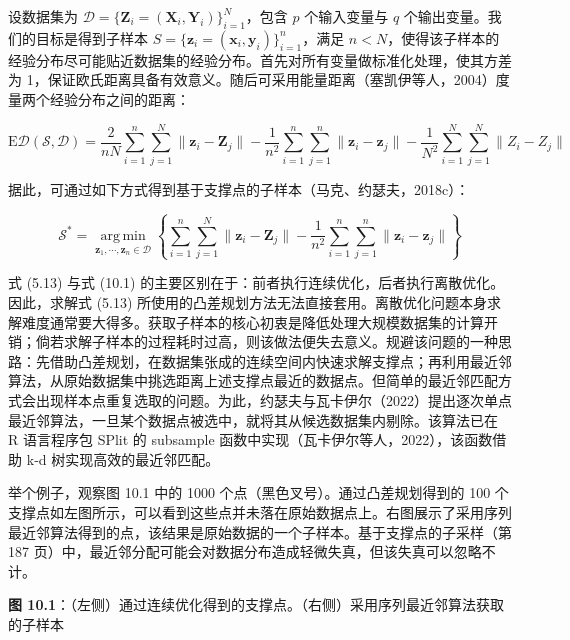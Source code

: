 \documentclass{ctexart}
\DeclareMathOperator*{\argmin}{arg\,min}
\begin{document}
设数据集为 $\mathcal{D}=\{\boldsymbol{Z}_i=(\boldsymbol{X}_i,\boldsymbol{Y}_i)\}_{i=1}^{N}$，包含 $p$ 个输入变量与 $q$ 个输出变量。我们的目标是得到子样本 $S=\{\boldsymbol{z}_i=(\boldsymbol{x}_i,\boldsymbol{y}_i)\}_{i=1}^{n}$，满足 $n<N$，使得该子样本的经验分布尽可能贴近数据集的经验分布。首先对所有变量做标准化处理，使其方差为 1，保证欧氏距离具备有效意义。随后可采用能量距离（塞凯伊等人，2004）度量两个经验分布之间的距离：

\begin{equation*}
\mathrm{E\mathcal{D}}(\mathcal{S},\mathcal{D})=\frac{2}{nN}\sum_{i=1}^{n}\sum_{j=1}^{N}\|\boldsymbol{z}_i-\boldsymbol{Z}_j\|-\frac{1}{n^2}\sum_{i=1}^{n}\sum_{j=1}^{n}\|\boldsymbol{z}_i-\boldsymbol{z}_j\|-\frac{1}{N^2}\sum_{i=1}^{N}\sum_{j=1}^{N}\|Z_i-Z_j\|
\end{equation*}

据此，可通过如下方式得到基于支撑点的子样本（马克、约瑟夫，2018c）：

\begin{equation*}
\mathcal{S}^{*}=\underset{\boldsymbol{z}_1,\cdots,\boldsymbol{z}_n\in \mathcal{D}}{\argmin}\left\{\sum_{i=1}^{n}\sum_{j=1}^{N}\|\boldsymbol{z}_i-\boldsymbol{Z}_j\|-\frac{1}{n^2}\sum_{i=1}^{n}\sum_{j=1}^{n}\|\boldsymbol{z}_i-\boldsymbol{z}_j\|\right\}
\tag{10.1}
\end{equation*}

式 (5.13) 与式 (10.1) 的主要区别在于：前者执行连续优化，后者执行离散优化。因此，求解式 (5.13) 所使用的凸差规划方法无法直接套用。离散优化问题本身求解难度通常要大得多。获取子样本的核心初衷是降低处理大规模数据集的计算开销；倘若求解子样本的过程耗时过高，则该做法便失去意义。规避该问题的一种思路：先借助凸差规划，在数据集张成的连续空间内快速求解支撑点；再利用最近邻算法，从原始数据集中挑选距离上述支撑点最近的数据点。但简单的最近邻匹配方式会出现样本点重复选取的问题。为此，约瑟夫与瓦卡伊尔（2022）提出逐次单点最近邻算法，一旦某个数据点被选中，就将其从候选数据集内剔除。该算法已在 R 语言程序包 SPlit 的 subsample 函数中实现（瓦卡伊尔等人，2022），该函数借助 k‑d 树实现高效的最近邻匹配。

举个例子，观察图 10.1 中的 1000 个点（黑色叉号）。通过凸差规划得到的 100 个支撑点如左图所示，可以看到这些点并未落在原始数据点上。右图展示了采用序列最近邻算法得到的点，该结果是原始数据的一个子样本。基于支撑点的子采样（第 187 页）中，最近邻分配可能会对数据分布造成轻微失真，但该失真可以忽略不计。

\begin{mdquote}
\textbf{图 10.1}：（左侧）通过连续优化得到的支撑点。（右侧）采用序列最近邻算法获取的子样本
\end{mdquote}
\end{document}
